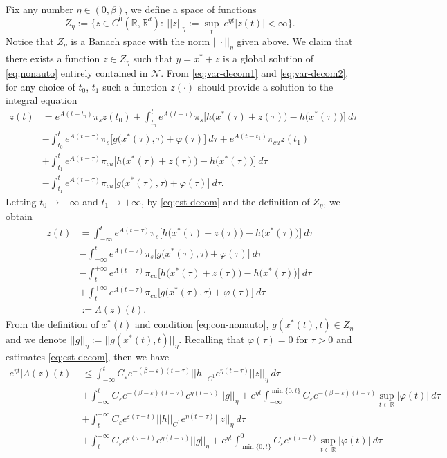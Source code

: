 \documentclass[11pt]{amsart}
\theoremstyle{definition}
\theoremstyle{remark}
\numberwithin{equation}{section}
\newcommand{\ep}{\varepsilon}
\begin{document}
Fix any number $\eta\in (0,\beta)$, we define a space of functions
$$ Z_\eta:=\{z\in C^0(\mathbb{R},\mathbb{R}^d):\ ||z||_\eta:=\underset{t}{\sup}\ e^{\eta t}|z(t)|<\infty\}. 
$$
Notice that $Z_\eta$ is a Banach space with the norm $||\cdot||_{\eta}$ given above. We claim that there exists a function $z\in Z_{\eta}$ such that $y=x^*+z$ is a global solution of \eqref{eq;nonauto} entirely contained in $\mathcal{N}$. From \eqref{eq;var-decom1} and \eqref{eq;var-decom2}, for any choice of $t_0$, $t_1$ such a function $z(\cdot)$ should provide a solution to the integral equation
\begin{align*}
    z(t)&=e^{A(t-t_0)}\pi_sz(t_0)+\int^t_{t_0}e^{A(t-\tau)}\pi_s\Big[h\big(x^*(\tau)+z(\tau)\big)-h\big(x^*(\tau)\big)\Big]\ d\tau\\
   &-\int^t_{t_0}e^{A(t-\tau)}\pi_{s}\Big[g\big(x^*(\tau),\tau\big)+\varphi(\tau)\Big]\ d\tau+e^{A(t-t_1)}\pi_{cu}z(t_1)\\
   &+\int^t_{t_1}e^{A(t-\tau)}\pi_{cu}\Big[h\big(x^*(\tau)+z(\tau)\big)-h\big(x^*(\tau)\big)\Big]\ d\tau\\
   &-\int^t_{t_1}e^{A(t-\tau)}\pi_{cu}\Big[g\big(x^*(\tau),\tau\big)+\varphi(\tau)\Big]\ d\tau.
\end{align*}
Letting $t_0\rightarrow-\infty$ and $t_1\rightarrow+\infty$, by \eqref{eq;est-decom} and the definition of $Z_{\eta}$, we obtain
\begin{equation}
    \begin{aligned}
        z(t)&=\int^t_{-\infty}e^{A(t-\tau)}\pi_s\Big[h\big(x^*(\tau)+z(\tau)\big)-h\big(x^*(\tau)\big)\Big]\ d\tau\\
   &-\int^t_{-\infty}e^{A(t-\tau)}\pi_{s}\Big[g\big(x^*(\tau),\tau\big)+\varphi(\tau)\Big]\ d\tau\\
   &-\int_t^{+\infty}e^{A(t-\tau)}\pi_{cu}\Big[h\big(x^*(\tau)+z(\tau)\big)-h\big(x^*(\tau)\big)\Big]\ d\tau\\
   &+\int_t^{+\infty}e^{A(t-\tau)}\pi_{cu}\Big[g\big(x^*(\tau),\tau\big)+\varphi(\tau)\Big]\ d\tau\\
   &:=\Lambda(z)(t).
    \end{aligned}
\end{equation}
From the definition of $x^*(t)$ and condition \eqref{eq;con-nonauto}, $g(x^*(t),t)\in Z_\eta$ and we denote $||g||_\eta:=||g(x^*(t),t)||_\eta$. Recalling that $\varphi(\tau)=0$ for $\tau>0$ and estimates \eqref{eq;est-decom}, then we have 
\begin{align*}
    e^{\eta t}|\Lambda(z)(t)|&\le \int^t_{-\infty}C_{\ep}e^{-(\beta-\ep)(t-\tau)}||h||_{C^1}e^{\eta(t-\tau)}||z||_{\eta}\ d\tau\\
   &+\int^t_{-\infty}C_{\ep}e^{-(\beta-\ep)(t-\tau)}e^{\eta(t-\tau)}||g||_\eta+e^{\eta t}\int^{\min\{0,t\}}_{-\infty}C_{\ep}e^{-(\beta-\ep)(t-\tau)}\sup_{t\in\mathbb{R}}|\varphi(t)|\ d\tau\\
   &+\int_t^{+\infty}C_{\ep}e^{\ep(\tau-t)}||h||_{C^1}e^{\eta(t-\tau)}||z||_{\eta}\ d\tau\\
   &+\int_t^{+\infty}C_{\ep}e^{\ep(\tau-t)}e^{\eta(t-\tau)}||g||_\eta+e^{\eta t}\int^0_{\min\{0,t\}}C_{\ep}e^{\ep(\tau-t)}\sup_{t\in\mathbb{R}}|\varphi(t)|\ d\tau\\
\end{align*}
\end{document}
